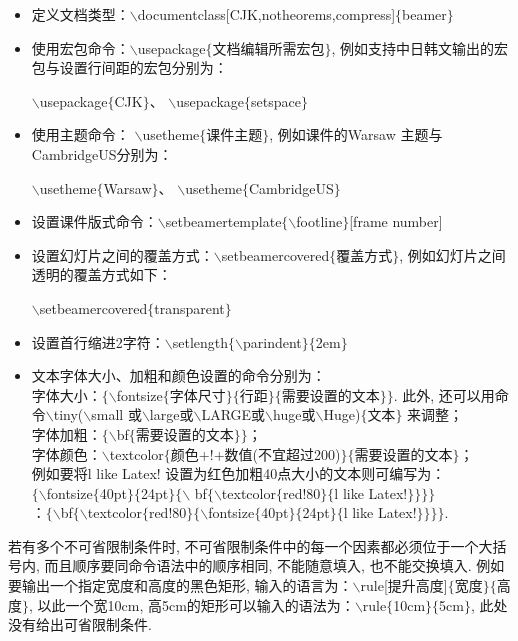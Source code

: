 \begin{itemize}
\item 定义文档类型：$\backslash$documentclass[CJK,notheorems,compress]$\{$beamer$\}$
    \item 使用宏包命令：$\backslash$usepackage$\{$文档编辑所需宏包$\}$, 例如支持中日韩文输出的宏包与设置行间距的宏包分别为：\\
 \centerline{
 $\backslash$usepackage$\{$CJK$\}${}、
 $\backslash$usepackage$\{$setspace$\}$
 }
    \item 使用主题命令：
$\backslash$usetheme$\{$课件主题$\}$, 例如课件的Warsaw 主题与CambridgeUS分别为：\\
\centerline{
$\backslash$usetheme$\{$Warsaw$\}${}、
$\backslash$usetheme$\{$CambridgeUS$\}$}
    \item 设置课件版式命令：$\backslash$setbeamertemplate$\{\backslash$footline$\}$[frame number]
    \item 设置幻灯片之间的覆盖方式：$\backslash$setbeamercovered$\{$覆盖方式$\}$, 例如幻灯片之间透明的覆盖方式如下：\\
    \centerline{
        $\backslash$setbeamercovered$\{$transparent$\}$}
    \item 设置首行缩进2字符：$\backslash$setlength$\{\backslash$parindent$\}\{$2em$\}$
    \item 文本字体大小、加粗和颜色设置的命令分别为：\\
字体大小：$\{\backslash$fontsize$\{$字体尺寸$\}\{$行距$\}\{$需要设置的文本$\}\}$. 此外, 还可以用命令$\backslash$tiny($\backslash$small 或$\backslash$large或$\backslash$LARGE或$\backslash$huge或$\backslash$Huge)$\{$文本$\}$ 来调整；\\
字体加粗：$\{\backslash$bf$\{$需要设置的文本$\}\}$；\\
字体颜色：$\backslash$textcolor$\{$颜色+!+数值(不宜超过200)$\} \{$需要设置的文本$\}$；\\
例如要将l like Latex! 设置为红色加粗40点大小的文本则可编写为：\\
$\{\backslash$fontsize$\{$40pt$\}\{$24pt$\}\{\backslash$ bf$\{\backslash$textcolor$\{$red!80$\}\{$l like Latex!$\}\}\}\}$\\
：$\{\backslash$bf$\{\backslash$textcolor$\{$red!80$\}\{\backslash$fontsize$\{$40pt$\}\{$24pt$\}\{$l like Latex!$\}\}\}\}$.
    \end{itemize}


若有多个不可省限制条件时, 不可省限制条件中的每一个因素都必须位于一个大括号内, 而且顺序要同命令语法中的顺序相同, 不能随意填入, 也不能交换填入. 例如要输出一个指定宽度和高度的黑色矩形, 输入的语言为：$\backslash$rule[提升高度]$\{$宽度$\}\{$高度$\}$, 以此一个宽10cm, 高5cm的矩形可以输入的语法为：$\backslash$rule$\{$10cm$\}\{$5cm$\}$, 此处没有给出可省限制条件.

